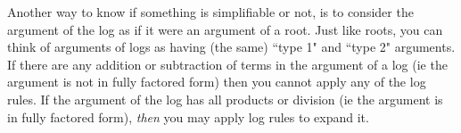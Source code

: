 \documentclass{ximeraXloud}
\begin{document}
    Another way to know if something is simplifiable or not, is to consider the argument of the log as if it were an argument of a root. Just like roots, you can think of arguments of logs as having (the same) ``type 1" and ``type 2" arguments. If there are any addition or subtraction of terms in the argument of a log (ie the argument is not in fully factored form) then you cannot apply any of the log rules. If the argument of the log has all products or division (ie the argument is in fully factored form), \textit{then} you may apply log rules to expand it.
    
%    
%
%
%
%
%
\end{document}
